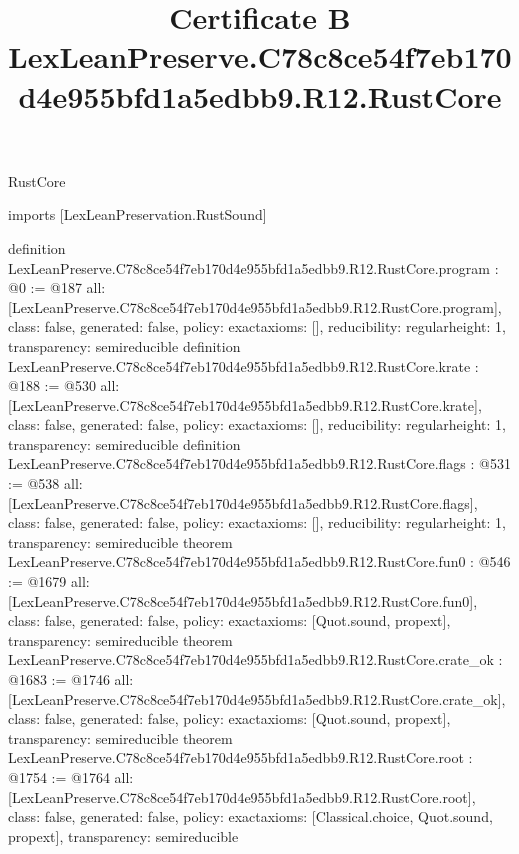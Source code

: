 \begin{lexlean}{RustCore}
\title{Certificate B LexLeanPreserve.C78c8ce54f7eb170d4e955bfd1a5edbb9.R12.RustCore}
\begin{coremodule}
imports [LexLeanPreservation.RustSound]

definition LexLeanPreserve.C78c8ce54f7eb170d4e955bfd1a5edbb9.R12.RustCore.program : @0 := @187 {
  all: [LexLeanPreserve.C78c8ce54f7eb170d4e955bfd1a5edbb9.R12.RustCore.program],
  class: false,
  generated: false,
  policy: exact{axioms: []},
  reducibility: regular{height: 1},
  transparency: semireducible
}
definition LexLeanPreserve.C78c8ce54f7eb170d4e955bfd1a5edbb9.R12.RustCore.krate : @188 := @530 {
  all: [LexLeanPreserve.C78c8ce54f7eb170d4e955bfd1a5edbb9.R12.RustCore.krate],
  class: false,
  generated: false,
  policy: exact{axioms: []},
  reducibility: regular{height: 1},
  transparency: semireducible
}
definition LexLeanPreserve.C78c8ce54f7eb170d4e955bfd1a5edbb9.R12.RustCore.flags : @531 := @538 {
  all: [LexLeanPreserve.C78c8ce54f7eb170d4e955bfd1a5edbb9.R12.RustCore.flags],
  class: false,
  generated: false,
  policy: exact{axioms: []},
  reducibility: regular{height: 1},
  transparency: semireducible
}
theorem LexLeanPreserve.C78c8ce54f7eb170d4e955bfd1a5edbb9.R12.RustCore.fun0 : @546 := @1679 {
  all: [LexLeanPreserve.C78c8ce54f7eb170d4e955bfd1a5edbb9.R12.RustCore.fun0],
  class: false,
  generated: false,
  policy: exact{axioms: [Quot.sound, propext]},
  transparency: semireducible
}
theorem LexLeanPreserve.C78c8ce54f7eb170d4e955bfd1a5edbb9.R12.RustCore.crate_ok : @1683 := @1746 {
  all: [LexLeanPreserve.C78c8ce54f7eb170d4e955bfd1a5edbb9.R12.RustCore.crate_ok],
  class: false,
  generated: false,
  policy: exact{axioms: [Quot.sound, propext]},
  transparency: semireducible
}
theorem LexLeanPreserve.C78c8ce54f7eb170d4e955bfd1a5edbb9.R12.RustCore.root : @1754 := @1764 {
  all: [LexLeanPreserve.C78c8ce54f7eb170d4e955bfd1a5edbb9.R12.RustCore.root],
  class: false,
  generated: false,
  policy: exact{axioms: [Classical.choice, Quot.sound, propext]},
  transparency: semireducible
}


\end{coremodule}
\end{lexlean}
